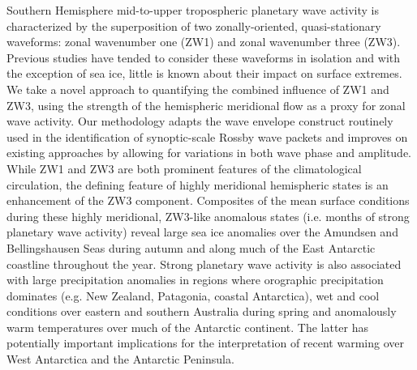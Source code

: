Southern Hemisphere mid-to-upper tropospheric planetary wave activity is characterized by the superposition of two zonally-oriented, quasi-stationary waveforms: zonal wavenumber one (ZW1) and zonal wavenumber three (ZW3). Previous studies have tended to consider these waveforms in isolation and with the exception of sea ice, little is known about their impact on surface extremes. We take a novel approach to quantifying the combined influence of ZW1 and ZW3, using the strength of the hemispheric meridional flow as a proxy for zonal wave activity. Our methodology adapts the wave envelope construct routinely used in the identification of synoptic-scale Rossby wave packets and improves on existing approaches by allowing for variations in both wave phase and amplitude. While ZW1 and ZW3 are both prominent features of the climatological circulation, the defining feature of highly meridional hemispheric states is an enhancement of the ZW3 component. Composites of the mean surface conditions during these highly meridional, ZW3-like anomalous states (i.e. months of strong planetary wave activity) reveal large sea ice anomalies over the Amundsen and Bellingshausen Seas during autumn and along much of the East Antarctic coastline throughout the year. Strong planetary wave activity is also associated with large precipitation anomalies in regions where orographic precipitation dominates (e.g. New Zealand, Patagonia, coastal Antarctica), wet and cool conditions over eastern and southern Australia during spring and anomalously warm temperatures over much of the Antarctic continent. The latter has potentially important implications for the interpretation of recent warming over West Antarctica and the Antarctic Peninsula.

